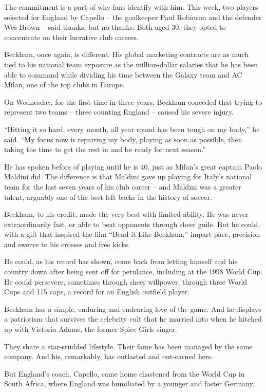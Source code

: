 ﻿\documentclass[12pt]{article}
\begin{document}
The commitment is a part of why fans identify with him. This week, two players selected for England
by Capello -- the goalkeeper Paul Robinson and the defender Wes Brown -- said thanks, but no thanks.
Both aged 30, they opted to concentrate on their lucrative club careers.

Beckham, once again, is different. His global marketing contracts are as much tied to his national
team exposure as the million-dollar salaries that he has been able to command while dividing his
time between the Galaxy team and AC Milan, one of the top clubs in Europe.

On Wednesday, for the first time in three years, Beckham conceded that trying to represent two teams
-- three counting England -- caused his severe injury.

``Hitting it so hard, every month, all year round has been tough on my body,'' he said. ``My focus
now is repairing my body, playing as soon as possible, then taking the time to get the rest in and
be ready for next season.''

He has spoken before of playing until he is 40, just as Milan's great captain Paolo Maldini did. The
difference is that Maldini gave up playing for Italy's national team for the last seven years of his
club career -- and Maldini was a greater talent, arguably one of the best left backs in the history
of soccer.

Beckham, to his credit, made the very best with limited ability. He was never extraordinarily fast,
or able to beat opponents through sheer guile. But he could, with a gift that inspired the film
``Bend it Like Beckham,'' impart pace, precision and swerve to his crosses and free kicks.

He could, as his record has shown, come back from letting himself and his country down after being
sent off for petulance, including at the 1998 World Cup. He could persevere, sometimes through sheer
willpower, through three World Cups and 115 caps, a record for an English outfield player.

Beckham has a simple, enduring and endearing love of the game. And he displays a patriotism that
survives the celebrity cult that he married into when he hitched up with Victoria Adams, the former
Spice Girls singer.

They share a star-studded lifestyle. Their fame has been managed by the same company. And his,
remarkably, has outlasted and out-earned hers.

But England's coach, Capello, came home chastened from the World Cup in South Africa, where England
was humiliated by a younger and faster Germany.
\end{document}
